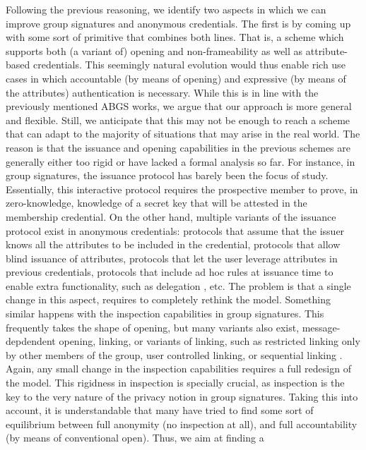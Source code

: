 Following the previous reasoning, we identify two aspects in which we can
improve group signatures and anonymous credentials. The first is by coming up
with some sort of primitive that combines both lines. That is, a scheme which
supports both (a variant of) opening and non-frameability as well as
attribute-based credentials. This seemingly natural evolution would thus
enable rich use cases in which accountable (by means of opening) and expressive
(by means of the attributes) authentication is necessary. While this is in
line with the previously mentioned ABGS works, we argue that our approach
is more general and flexible. Still, we anticipate that this may not be enough
to reach a scheme that can adapt to the majority of situations that may arise in
the real world. The reason is that the issuance and opening capabilities in the
previous schemes are generally either too rigid or have lacked a formal analysis
so far. For instance, in group signatures, the issuance protocol has barely been
the focus of study. Essentially, this interactive protocol requires the
prospective member to prove, in zero-knowledge, knowledge of a secret key
that will be attested in the membership credential. On the other hand, multiple
variants of the issuance protocol exist in anonymous credentials: protocols that
assume that the issuer knows all the attributes to be included in the credential,
protocols that allow blind issuance of attributes, protocols that let the user
leverage attributes in previous credentials, protocols that include ad hoc
rules at issuance time to enable extra functionality, such as delegation
, etc. The problem is that a single change in this aspect, requires to
completely rethink the model. Something similar happens with the inspection
capabilities in group signatures. This frequently takes the shape of opening,
but many variants also exist, message-depdendent opening, linking, or variants
of linking, such as restricted linking only by other members of the group,
user controlled linking, or sequential linking \needcite. Again, any small
change in the inspection capabilities requires a full redesign of the model.
This rigidness in inspection is specially crucial, as inspection is the key
to the very nature of the privacy notion in group signatures. Taking this into
account, it is understandable that many have tried to find some sort of
equilibrium between full anonymity (no inspection at all), and full
accountability (by means of conventional open). Thus, we aim at finding a
